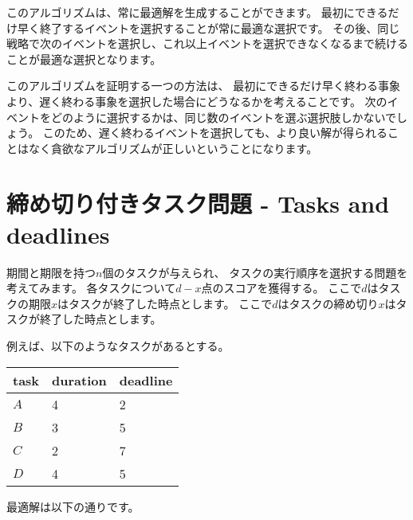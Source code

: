 このアルゴリズムは、常に最適解を生成することができます。
最初にできるだけ早く終了するイベントを選択することが常に最適な選択です。
その後、同じ戦略で次のイベントを選択し、これ以上イベントを選択できなくなるまで続けることが最適な選択となります。

このアルゴリズムを証明する一つの方法は、
最初にできるだけ早く終わる事象より、遅く終わる事象を選択した場合にどうなるかを考えることです。
次のイベントをどのように選択するかは、同じ数のイベントを選ぶ選択肢しかないでしょう。
このため、遅く終わるイベントを選択しても、より良い解が得られることはなく貪欲なアルゴリズムが正しいということになります。

\section{締め切り付きタスク問題 - Tasks and deadlines}

期間と期限を持つ$n$個のタスクが与えられ、
タスクの実行順序を選択する問題を考えてみます。
各タスクについて$d - x$点のスコアを獲得する。
ここで$d$はタスクの期限$x$はタスクが終了した時点とします。
ここで$d$はタスクの締め切り$x$はタスクが終了した時点とします。

例えば、以下のようなタスクがあるとする。

\begin{center}
\begin{tabular}{lll}
task & duration & deadline \\
\hline
$A$ & 4 & 2 \\
$B$ & 3 & 5 \\
$C$ & 2 & 7 \\
$D$ & 4 & 5 \\
\end{tabular}
\end{center}

最適解は以下の通りです。

\begin{center}
\end{center}

